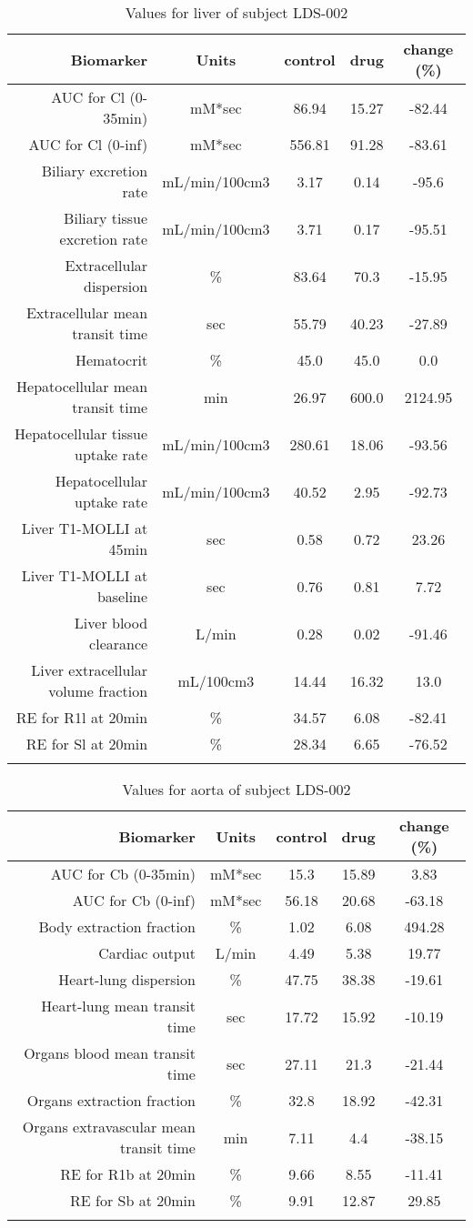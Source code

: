 \documentclass{epflreport}%
\begin{document}
%
\clearpage%
\begin{longtable}{rcccc}%
\hline%
Biomarker&Units&control&drug&change (\%)\\%
\hline%
AUC for Cl (0{-}35min)&mM*sec&86.94&15.27&{-}82.44\\%
AUC for Cl (0{-}inf)&mM*sec&556.81&91.28&{-}83.61\\%
Biliary excretion rate&mL/min/100cm3&3.17&0.14&{-}95.6\\%
Biliary tissue excretion rate&mL/min/100cm3&3.71&0.17&{-}95.51\\%
Extracellular dispersion&\%&83.64&70.3&{-}15.95\\%
Extracellular mean transit time&sec&55.79&40.23&{-}27.89\\%
Hematocrit&\%&45.0&45.0&0.0\\%
Hepatocellular mean transit time&min&26.97&600.0&2124.95\\%
Hepatocellular tissue uptake rate&mL/min/100cm3&280.61&18.06&{-}93.56\\%
Hepatocellular uptake rate&mL/min/100cm3&40.52&2.95&{-}92.73\\%
Liver T1{-}MOLLI at 45min&sec&0.58&0.72&23.26\\%
Liver T1{-}MOLLI at baseline&sec&0.76&0.81&7.72\\%
Liver blood clearance&L/min&0.28&0.02&{-}91.46\\%
Liver extracellular volume fraction&mL/100cm3&14.44&16.32&13.0\\%
RE for R1l at 20min&\%&34.57&6.08&{-}82.41\\%
RE for Sl at 20min&\%&28.34&6.65&{-}76.52\\%
\hline%
\caption{Values for liver of subject LDS-002} \\%
\end{longtable}%
\begin{longtable}{rcccc}%
\hline%
Biomarker&Units&control&drug&change (\%)\\%
\hline%
AUC for Cb (0{-}35min)&mM*sec&15.3&15.89&3.83\\%
AUC for Cb (0{-}inf)&mM*sec&56.18&20.68&{-}63.18\\%
Body extraction fraction&\%&1.02&6.08&494.28\\%
Cardiac output&L/min&4.49&5.38&19.77\\%
Heart{-}lung dispersion&\%&47.75&38.38&{-}19.61\\%
Heart{-}lung mean transit time&sec&17.72&15.92&{-}10.19\\%
Organs blood mean transit time&sec&27.11&21.3&{-}21.44\\%
Organs extraction fraction&\%&32.8&18.92&{-}42.31\\%
Organs extravascular mean transit time&min&7.11&4.4&{-}38.15\\%
RE for R1b at 20min&\%&9.66&8.55&{-}11.41\\%
RE for Sb at 20min&\%&9.91&12.87&29.85\\%
\hline%
\caption{Values for aorta of subject LDS-002} \\%
\end{longtable}%
\clearpage%
\end{document}
